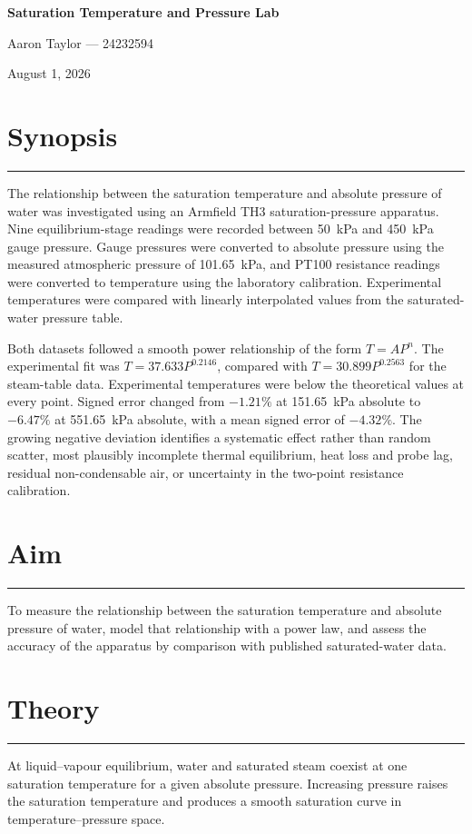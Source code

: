 \documentclass[11pt,a4paper]{article}
\newcommand{\sectionrule}{\vspace{-2pt}\color{rulegray}\hrule\color{black}\vspace{5pt}}
\begin{document}
\begin{center}
  {\LARGE\bfseries Saturation Temperature and Pressure Lab}\par
  \vspace{3mm}
  {\large Aaron Taylor --- 24232594}\par
  \vspace{1.5mm}
  {\large August 1, 2026}\par
\end{center}
\vspace{4mm}

\section*{Synopsis}
\sectionrule
The relationship between the saturation temperature and absolute pressure of
water was investigated using an Armfield TH3 saturation-pressure apparatus.
Nine equilibrium-stage readings were recorded between \SI{50}{\kilo\pascal} and
\SI{450}{\kilo\pascal} gauge pressure. Gauge pressures were converted to absolute
pressure using the measured atmospheric pressure of \SI{101.65}{\kilo\pascal},
and PT100 resistance readings were converted to temperature using the
laboratory calibration. Experimental temperatures were compared with linearly
interpolated values from the saturated-water pressure table.

Both datasets followed a smooth power relationship of the form
$T=AP^n$. The experimental fit was $T=37.633P^{0.2146}$, compared with
$T=30.899P^{0.2563}$ for the steam-table data. Experimental temperatures were
below the theoretical values at every point. Signed error changed from
$-1.21\%$ at \SI{151.65}{\kilo\pascal} absolute to $-6.47\%$ at
\SI{551.65}{\kilo\pascal} absolute, with a mean signed error of $-4.32\%$.
The growing negative deviation identifies a systematic effect rather than
random scatter, most plausibly incomplete thermal equilibrium, heat loss and
probe lag, residual non-condensable air, or uncertainty in the two-point
resistance calibration.

\section{Aim}
\sectionrule
To measure the relationship between the saturation temperature and absolute
pressure of water, model that relationship with a power law, and assess the
accuracy of the apparatus by comparison with published saturated-water data.

\section{Theory}
\sectionrule
At liquid--vapour equilibrium, water and saturated steam coexist at one
saturation temperature for a given absolute pressure. Increasing pressure
raises the saturation temperature and produces a smooth saturation curve in
temperature--pressure space.
\end{document}
